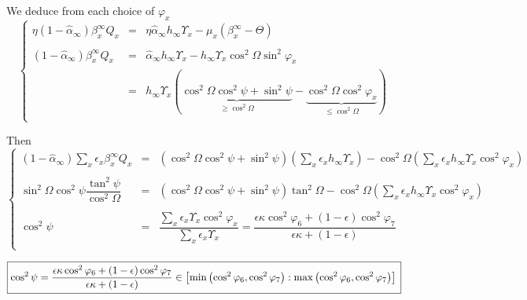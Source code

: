 \documentclass[aps,onecolumn,10pt]{revtex4}
\begin{document}
\begin{itemize}
We deduce from each choice of $\varphi_x$
\begin{equation}
\label{eq:Qx}
\left\lbrace
\begin{array}{rcl}
	\eta (1-\hat\alpha_\infty) \beta_x^\infty Q_x & = & \eta \hat\alpha_\infty h_\infty \Upsilon_x - \mu_x\left(\beta_x^\infty - \Theta \right)\\
	\\
	 (1-\hat\alpha_\infty) \beta_x^\infty Q_x & = & \hat\alpha_\infty h_\infty \Upsilon_x -   {h_\infty\Upsilon_x\cos^2\Omega}\sin^2 \varphi_x\\
	 & = &  h_\infty \Upsilon_x \left( \underbrace{\cos^2\Omega \cos^2\psi + \sin^2\psi}_{\geq \cos^2\Omega} - \underbrace{\cos^2\Omega \cos^2 \varphi_x}_{\leq\cos^2\Omega} \right)\\
\end{array}
\right.
\end{equation}

Then
\begin{equation}
\left\lbrace
\begin{array}{rcl}
 (1-\hat\alpha_\infty) \sum_x \epsilon_x \beta_x^\infty Q_x & = & 
 \left(\cos^2\Omega \cos^2\psi + \sin^2\psi\right) \left(\sum_x \epsilon_x h_\infty \Upsilon_x\right) - \cos^2 \Omega \left(\sum_x \epsilon_x h_\infty \Upsilon_x \cos^2 \varphi_x \right)\\
 \\
\sin^2\Omega  \cos^2\psi \dfrac{\tan^2\psi}{\cos^2\Omega} & = & \left(\cos^2\Omega \cos^2\psi + \sin^2\psi\right) \tan^2 \Omega
 - \cos^2 \Omega \left(\sum_x \epsilon_x h_\infty \Upsilon_x \cos^2 \varphi_x \right)\\
 \\
 \cos^2\psi & = & \dfrac{\sum_x \epsilon_x \Upsilon_x \cos^2 \varphi_x }{\sum_x \epsilon_x \Upsilon_x} 
 = \dfrac{\epsilon\kappa\cos^2\varphi_6+(1-\epsilon)\cos^2\varphi_7}{\epsilon\kappa+(1-\epsilon)}\\
\end{array}
\right.
\end{equation}

\begin{equation}
	\boxed
	{
	\cos^2\psi = \dfrac{\epsilon\kappa\cos^2\varphi_6+(1-\epsilon)\cos^2\varphi_7}{\epsilon\kappa+(1-\epsilon)} 
	 \in  \left[\min\left(\cos^2\varphi_6,\cos^2\varphi_7\right):\max\left(\cos^2\varphi_6,\cos^2\varphi_7\right)\right] \\
	}
\end{equation}

\end{itemize}
\end{document}
